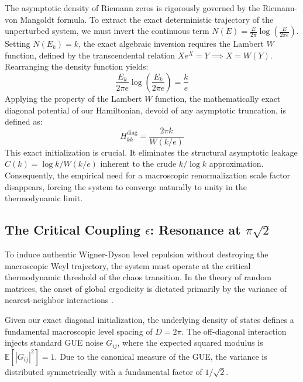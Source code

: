 \documentclass[prl,aps,floatfix,superscriptaddress,10pt]{revtex4-2}
\begin{document}
The asymptotic density of Riemann zeros is rigorously governed by the Riemann-von Mangoldt formula.
To extract the exact deterministic trajectory of the unperturbed system, we must invert the continuous term $N(E) = \frac{E}{2\pi} \log\left(\frac{E}{2\pi e}\right)$.
Setting $N(E_k) = k$, the exact algebraic inversion requires the Lambert $W$ function, defined by the transcendental relation $X e^X = Y \implies X = W(Y)$.
Rearranging the density function yields:
\begin{equation}
\frac{E_k}{2\pi e} \log\left(\frac{E_k}{2\pi e}\right) = \frac{k}{e}
\end{equation}
Applying the property of the Lambert $W$ function, the mathematically exact diagonal potential of our Hamiltonian, devoid of any asymptotic truncation, is defined as:
\begin{equation}
\boxed{ H_{kk}^{\text{diag}} = \frac{2\pi k}{W(k/e)} }
\end{equation}
This exact initialization is crucial. It eliminates the structural asymptotic leakage $C(k) = \log k / W(k/e)$ inherent to the crude $k / \log k$ approximation. Consequently, the empirical need for a macroscopic renormalization scale factor disappears, forcing the system to converge naturally to unity in the thermodynamic limit.

\subsection{The Critical Coupling $\epsilon$: Resonance at $\pi \sqrt{2}$}

To induce authentic Wigner-Dyson level repulsion without destroying the macroscopic Weyl trajectory, the system must operate at the critical thermodynamic threshold of the chaos transition. In the theory of random matrices, the onset of global ergodicity is dictated primarily by the variance of nearest-neighbor interactions \cite{Mirlin1996}.

Given our exact diagonal initialization, the underlying density of states defines a fundamental macroscopic level spacing of $D = 2\pi$. The off-diagonal interaction injects standard GUE noise $G_{ij}$, where the expected squared modulus is $\mathbb{E}[|G_{ij}|^2] = 1$. Due to the canonical measure of the GUE, the variance is distributed symmetrically with a fundamental factor of $1/\sqrt{2}$.
\end{document}
